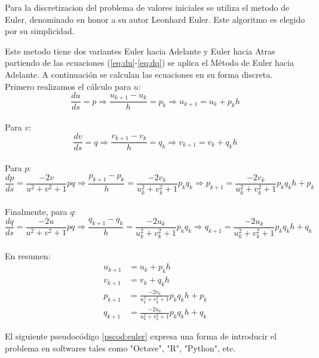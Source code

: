 \documentclass{endm}
\begin{document}
Para la discretizacion del problema de valores iniciales se utiliza el metodo de Euler, denominado en honor a su autor Leonhard Euler. Este algoritmo es elegido por su simplicidad.


Este metodo tiene dos variantes Euler hacia Adelante y Euler hacia Atras partiendo de las ecuaciones (\ref{eq:du}-\ref{eq:dq}) se aplica el M\'etodo de Euler hacia Adelante. A continuaci\'on se calculan las ecuaciones en su forma discreta.\\



Primero realizamos el c\'alculo para $u$:\\
$$\frac{du}{ds}=p \Rightarrow \frac{u_{k+1}-u_k}{h}=p_k \Rightarrow u_{k+1}=u_k+p_k h $$\\
Para $v$:\\
$$\frac{dv}{ds}=q \Rightarrow \frac{v_{k+1}-v_k}{h}=q_k \Rightarrow v_{k+1}=v_k+q_k h $$\\
Para $p$:\\
$$\frac{dp}{ds}=\frac{-2v}{u^2+v^2+1} pq \Rightarrow \frac{p_{k+1}-p_k}{h}=\frac{-2v_k}{u_k^2+v_k^2+1} p_kq_k \Rightarrow p_{k+1}=\frac{-2v_k }{u_k^2+v_k^2+1} p_kq_k h + p_k $$\\
Finalmente, para $q$:\\
$$ \frac{dq}{ds}=\frac{-2u}{u^2+v^2+1} pq \Rightarrow \frac{q_{k+1}-q_k}{h}=\frac{-2u_k}{u_k^2+v_k^2+1} p_kq_k \Rightarrow q_{k+1}=\frac{-2u_k}{u_k^2+v_k^2+1} p_kq_k h +q_k $$\\


En resumen:
\begin{align}
u_{k+1}&=u_k+p_k h \label{eq:dudis} \\
v_{k+1}&=v_k+q_k h \label{eq:dvdis} \\
p_{k+1}&=\frac{-2v_k }{u_k^2+v_k^2+1} p_kq_k h + p_k \label{eq:dpdis} \\
q_{k+1}&=\frac{-2u_k}{u_k^2+v_k^2+1} p_kq_k h +q_k\label{eq:dqdis}
\end{align}

El  siguiente pseudoc\'odigo \ref{pscod:euler} expresa una forma de introducir el problema en softwares tales como "Octave", "R", "Python", etc.
\end{document}
